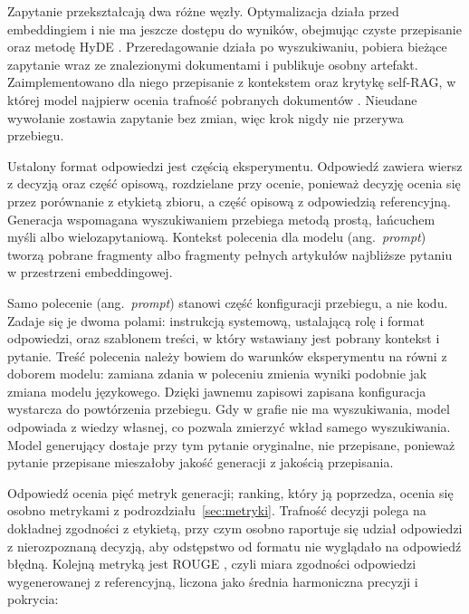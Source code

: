 Zapytanie przekształcają dwa różne węzły. Optymalizacja działa przed embeddingiem i nie ma jeszcze
dostępu do wyników, obejmując czyste przepisanie oraz metodę HyDE \cite{gao2023hyde}.
Przeredagowanie działa po wyszukiwaniu, pobiera bieżące zapytanie wraz ze znalezionymi dokumentami
i publikuje osobny artefakt. Zaimplementowano dla niego przepisanie z kontekstem oraz krytykę
self-RAG, w której model najpierw ocenia trafność pobranych dokumentów \cite{asai2024selfrag}.
Nieudane wywołanie zostawia zapytanie bez zmian, więc krok nigdy nie
przerywa przebiegu.

Ustalony format odpowiedzi jest częścią eksperymentu. Odpowiedź zawiera wiersz z decyzją oraz
część opisową, rozdzielane przy ocenie, ponieważ decyzję ocenia się przez porównanie z etykietą
zbioru, a część opisową z odpowiedzią referencyjną. Generacja wspomagana wyszukiwaniem
\cite{lewis2020retrieval, shuster2021retrieval} przebiega metodą prostą, łańcuchem myśli albo
wielozapytaniową. Kontekst polecenia dla modelu (ang.\ \textit{prompt}) tworzą pobrane fragmenty
albo fragmenty pełnych artykułów najbliższe pytaniu w przestrzeni embeddingowej.

Samo polecenie (ang.\ \textit{prompt}) stanowi część konfiguracji przebiegu, a nie kodu. Zadaje
się je dwoma polami: instrukcją systemową, ustalającą rolę i format odpowiedzi, oraz szablonem
treści, w który wstawiany jest pobrany kontekst i pytanie. Treść polecenia należy bowiem do
warunków eksperymentu na równi z doborem modelu: zamiana zdania w poleceniu zmienia wyniki
podobnie jak zmiana modelu językowego. Dzięki jawnemu zapisowi zapisana konfiguracja wystarcza
do powtórzenia przebiegu. Gdy w grafie nie ma wyszukiwania, model odpowiada z wiedzy własnej,
co pozwala zmierzyć wkład samego wyszukiwania. Model generujący dostaje przy tym pytanie
oryginalne, nie przepisane, ponieważ pytanie przepisane mieszałoby jakość generacji z jakością
przepisania.

Odpowiedź ocenia pięć metryk generacji; ranking, który ją poprzedza, ocenia się osobno metrykami
z podrozdziału~\ref{sec:metryki}. Trafność decyzji polega na dokładnej zgodności z etykietą, przy
czym osobno raportuje się udział odpowiedzi z nierozpoznaną decyzją, aby odstępstwo od formatu nie
wyglądało na odpowiedź błędną. Kolejną metryką jest ROUGE \cite{lin2004rouge}, czyli miara
zgodności odpowiedzi wygenerowanej z referencyjną, liczona jako średnia harmoniczna precyzji
i pokrycia:


